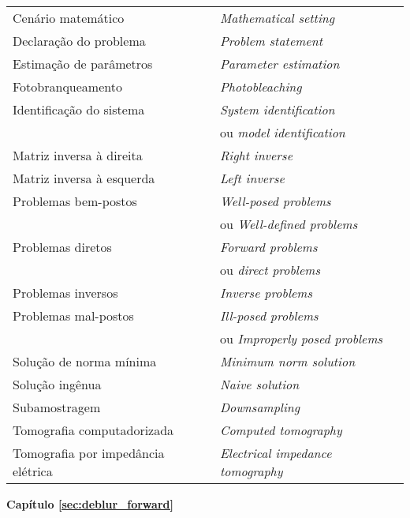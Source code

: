 \begin{table}[H]
\begin{center}
\begin{tabular}{ l l }
Cenário matemático & \textit{Mathematical setting}\\
Declaração do problema & \textit{Problem statement}\\
Estimação de parâmetros & \textit{Parameter estimation} \\
Fotobranqueamento & \textit{Photobleaching} \\
Identificação do sistema & \textit{System identification}\\
 & \quad ou \textit{model identification} \\
Matriz inversa à direita & \textit{Right inverse} \\
Matriz inversa à esquerda & \textit{Left inverse} \\
Problemas bem-postos & \textit{Well-posed problems}\\
 & \quad ou  \textit{Well-defined problems}\\
Problemas diretos & \textit{Forward problems} \\
 & \quad ou  \textit{direct problems} \cite{Bertero2021}\\
Problemas inversos & \textit{Inverse problems} \\
Problemas mal-postos & \textit{Ill-posed problems} \\
 & \quad ou \textit{Improperly posed problems} \\
Solução de norma mínima & \textit{Minimum norm solution} \\
Solução ingênua & \textit{Naive solution} \\
Subamostragem & \textit{Downsampling} \\
Tomografia computadorizada & \textit{Computed tomography} \\
Tomografia por impedância elétrica & \textit{Electrical impedance tomography} \\
\end{tabular}
\end{center}
\end{table}

\begin{center}
\textbf{Capítulo \ref{sec:deblur_forward}}
\end{center}

